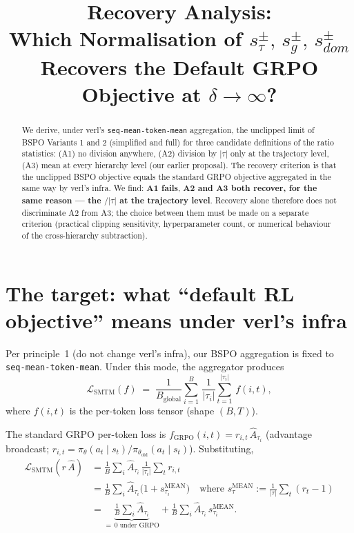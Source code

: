 \documentclass[11pt]{article}
\title{Recovery Analysis: \\
Which Normalisation of $s_\tau^\pm,\,s_g^\pm,\,s_{dom}^\pm$ Recovers the Default GRPO Objective at $\delta\to\infty$?}
\author{}
\date{}
\newcommand{\smean}{s^{\text{MEAN}}}
\begin{document}
\maketitle

\begin{abstract}
We derive, under verl's \texttt{seq-mean-token-mean} aggregation, the
unclipped limit of BSPO Variants 1 and 2 (simplified and full) for three
candidate definitions of the ratio statistics: (A1) no division anywhere,
(A2) division by $|\tau|$ only at the trajectory level, (A3) mean at every
hierarchy level (our earlier proposal). The recovery criterion is that the
unclipped BSPO objective equals the standard GRPO objective aggregated in
the same way by verl's infra. We find: \textbf{A1 fails}, \textbf{A2 and A3
both recover, for the same reason --- the $/|\tau|$ at the trajectory
level}. Recovery alone therefore does not discriminate A2 from A3; the
choice between them must be made on a separate criterion (practical
clipping sensitivity, hyperparameter count, or numerical behaviour of the
cross-hierarchy subtraction).
\end{abstract}

\section{The target: what ``default RL objective'' means under verl's infra}
\label{sec:target}

Per principle~1 (do not change verl's infra), our BSPO aggregation is fixed
to \texttt{seq-mean-token-mean}. Under this mode, the aggregator produces
\[
\mathcal L_{\text{SMTM}}(f) \;=\; \frac{1}{B_{\text{global}}}
\sum_{i=1}^{B}\,\frac{1}{|\tau_i|}\sum_{t=1}^{|\tau_i|}\,f(i,t),
\]
where $f(i,t)$ is the per-token loss tensor (shape $(B,T)$).

The standard GRPO per-token loss is $f_{\text{GRPO}}(i,t)=r_{i,t}\,\hat
A_{\tau_i}$ (advantage broadcast; $r_{i,t}=\pi_\theta(a_t\mid
s_t)/\pi_{\theta_{\text{old}}}(a_t\mid s_t)$). Substituting,
\begin{align*}
\mathcal L_{\text{SMTM}}(r\,\hat A)
  &= \frac{1}{B}\sum_i \hat A_{\tau_i}\,\frac{1}{|\tau_i|}\sum_t r_{i,t} \\
  &= \frac{1}{B}\sum_i \hat A_{\tau_i}\bigl(1 + \smean_{\tau_i}\bigr)
   \quad\text{where }\smean_\tau := \frac{1}{|\tau|}\sum_t (r_t-1) \\
  &= \underbrace{\frac{1}{B}\sum_i \hat A_{\tau_i}}_{=\,0\text{ under GRPO}}
   + \frac{1}{B}\sum_i \hat A_{\tau_i}\,\smean_{\tau_i}.
\end{align*}
\end{document}
